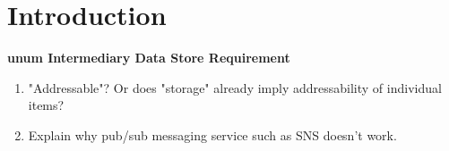 \section{Introduction}

\textbf{unum Intermediary Data Store Requirement}

\begin{enumerate}
    \item "Addressable"? Or does "storage" already imply addressability of individual items?
    \item Explain why pub/sub messaging service such as SNS doesn't work.
\end{enumerate}